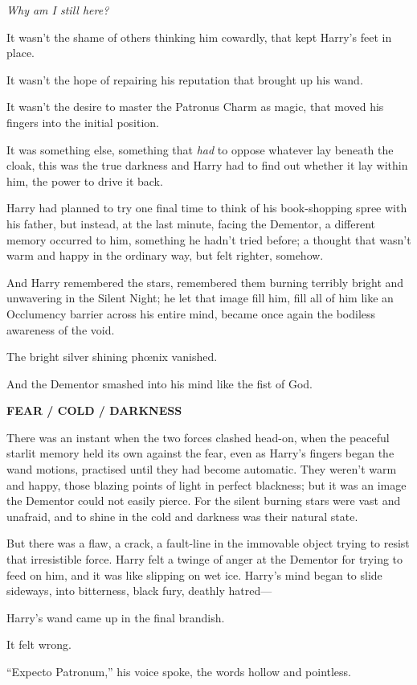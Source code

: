 \emph{Why am I still here?}

It wasn’t the shame of others thinking him cowardly, that kept Harry’s feet in place.

It wasn’t the hope of repairing his reputation that brought up his wand.

It wasn’t the desire to master the Patronus Charm as magic, that moved his fingers into the initial position.

It was something else, something that \emph{had} to oppose whatever lay beneath the cloak, this was the true darkness and Harry had to find out whether it lay within him, the power to drive it back.

Harry had planned to try one final time to think of his book-shopping spree with his father, but instead, at the last minute, facing the Dementor, a different memory occurred to him, something he hadn’t tried before; a thought that wasn’t warm and happy in the ordinary way, but felt righter, somehow.

And Harry remembered the stars, remembered them burning terribly bright and unwavering in the Silent Night; he let that image fill him, fill all of him like an Occlumency barrier across his entire mind, became once again the bodiless awareness of the void.

The bright silver shining phœnix vanished.

And the Dementor smashed into his mind like the fist of God.

\textbf{FEAR / COLD / DARKNESS}

There was an instant when the two forces clashed head-on, when the peaceful starlit memory held its own against the fear, even as Harry’s fingers began the wand motions, practised until they had become automatic. They weren’t warm and happy, those blazing points of light in perfect blackness; but it was an image the Dementor could not easily pierce. For the silent burning stars were vast and unafraid, and to shine in the cold and darkness was their natural state.

But there was a flaw, a crack, a fault-line in the immovable object trying to resist that irresistible force. Harry felt a twinge of anger at the Dementor for trying to feed on him, and it was like slipping on wet ice. Harry’s mind began to slide sideways, into bitterness, black fury, deathly hatred—

Harry’s wand came up in the final brandish.

It felt wrong.

“Expecto Patronum,” his voice spoke, the words hollow and pointless.

